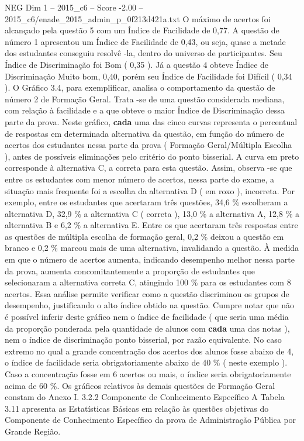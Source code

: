 \begin{textsample}{NEG Dim 1 – 2015\_c6 – Score -2.00 – 2015\_c6/enade\_2015\_admin\_p\_0f213d421a.txt}
O máximo de acertos foi alcançado pela questão 5 com um Índice de Facilidade de 0,77.
A questão de número 1 apresentou um Índice de Facilidade de 0,43, ou seja, quase a metade dos estudantes conseguiu resolvê -la, dentro do universo de participantes.
Seu Índice de Discriminação foi Bom ( 0,35 ).
Já a questão 4 obteve Índice de Discriminação Muito bom, 0,40, porém seu Índice de Facilidade foi Difícil ( 0,34 ).
O Gráfico 3.4, para exemplificar, analisa o comportamento da questão de número 2 de Formação Geral.
Trata -se de uma questão considerada mediana, com relação à facilidade e a que obteve o maior Índice de Discriminação dessa parte da prova.
Neste gráfico, \textbf{cada} uma das cinco curvas representa o percentual de respostas em determinada alternativa da questão, em função do número de acertos dos estudantes nessa parte da prova ( Formação Geral/Múltipla Escolha ), antes de possíveis eliminações pelo critério do ponto bisserial.
A curva em preto corresponde à alternativa C, a correta para esta questão.
Assim, observa -se que entre os estudantes com menor número de acertos, nessa parte do exame, a situação mais frequente foi a escolha da alternativa D ( em roxo ), incorreta.
Por exemplo, entre os estudantes que acertaram três questões, 34,6 \% escolheram a alternativa D, 32,9 \% a alternativa C ( correta ), 13,0 \% a alternativa A, 12,8 \% a alternativa B e 6,2 \% a alternativa E.
Entre os que acertaram três respostas entre as questões de múltipla escolha de formação geral, 0,2 \% deixou a questão em branco e 0,2 \% marcou mais de uma alternativa, invalidando a questão.
À medida em que o número de acertos aumenta, indicando desempenho melhor nessa parte da prova, aumenta concomitantemente a proporção de estudantes que selecionaram a alternativa correta C, atingindo 100 \% para os estudantes com 8 acertos.
Essa análise permite verificar como a questão discriminou os grupos de desempenho, justificando o alto índice obtido na questão.
Cumpre notar que não é possível inferir deste gráfico nem o índice de facilidade ( que seria uma média da proporção ponderada pela quantidade de alunos com \textbf{cada} uma das notas ), nem o índice de discriminação ponto bisserial, por razão equivalente.
No caso extremo no qual a grande concentração dos acertos dos alunos fosse abaixo de 4, o índice de facilidade seria obrigatoriamente abaixo de 40 \% ( neste exemplo ).
Caso a concentração fosse em 6 acertos ou mais, o índice seria obrigatoriamente acima de 60 \%.
Os gráficos relativos às demais questões de Formação Geral constam do Anexo I. 3.2.2 Componente de Conhecimento Específico A Tabela 3.11 apresenta as Estatísticas Básicas em relação às questões objetivas do Componente de Conhecimento Específico da prova de Administração Pública por Grande Região.

\end{textsample}
